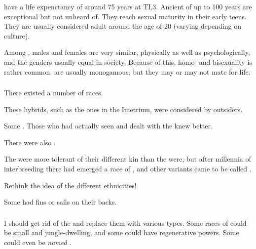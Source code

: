 \Scathae{} have a life expenctancy of around 75 years at TL3. Ancient \scathae{} of up to 100 years are exceptional but not unheard of. They reach sexual maturity in their early teens. They are usually considered adult around the age of 20 (varying depending on culture). 

Among \scathae{}, males and females are very similar, physically as well as psychologically, and the genders usually equal in society. Because of this, homo- and bisexuality is rather common. \Scathae{} are usually monogamous, but they may or may not mate for life.  





\subsubsection{\Demiscathae}
There existed a number of \quo{\demiscatha} races. 

\begin{gloss}
    These hybrids, such as the ones in the Imetrium, were considered \demiscathae by outsiders. 
  
    Some .
    Those who had actually seen and dealt with the \nagae knew better.
\end{gloss}

There were also .

The \scathae were more tolerant of their different kin than the \humans were, but after millennia of interbreeding there had emerged a race of  \scathae, and other variants came to be called \quo{\demiscathae}. 

Rethink the idea of the different \scatha ethnicities!

Some \scathae had fins or sails on their backs. 





\subsubsection{\Meccara}
I should get rid of the \meccara and replace them with various \demiscatha types. 
Some races of \demiscathae could be small and jungle-dwelling, and some could have regenerative powers. 
Some could even be \emph{named} \quo{\meccara}. 

